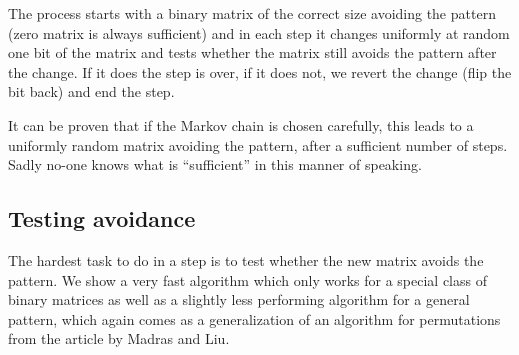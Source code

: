 The process starts with a binary matrix of the correct size avoiding the pattern (zero matrix is always sufficient) and in each step it changes uniformly at random one bit of the matrix and tests whether the matrix still avoids the pattern after the change. If it does the step is over, if it does not, we revert the change (flip the bit back) and end the step.

It can be proven that if the Markov chain is chosen carefully, this leads to a uniformly random matrix avoiding the pattern, after a sufficient number of steps. Sadly no-one knows what is ``sufficient'' in this manner of speaking.

\subsection*{Testing avoidance}
The hardest task to do in a step is to test whether the new matrix avoids the pattern. We show a very fast algorithm which only works for a special class of binary matrices as well as a slightly less performing algorithm for a general pattern, which again comes as a generalization of an algorithm for permutations from the article by Madras and Liu.

